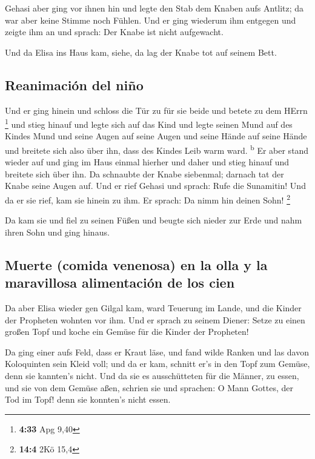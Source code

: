  Gehasi aber ging vor ihnen hin und legte den Stab dem
Knaben aufs Antlitz; da war aber keine Stimme noch Fühlen. Und er ging
wiederum ihm entgegen und zeigte ihm an und sprach: Der Knabe ist nicht
aufgewacht.

 Und da Elisa ins Haus kam, siehe, da lag der Knabe tot
auf seinem Bett.

\hypertarget{reanimaciuxf3n-del-niuxf1o}{%
\subsection{Reanimación del niño}\label{reanimaciuxf3n-del-niuxf1o}}

 Und er ging hinein und schloss die Tür zu für sie beide
und betete zu dem HErrn \footnote{\textbf{4:33} Apg 9,40}
 und stieg hinauf und legte sich auf das Kind und legte
seinen Mund auf des Kindes Mund und seine Augen auf seine Augen und
seine Hände auf seine Hände und breitete sich also über ihn, dass des
Kindes Leib warm ward. \textsuperscript{b}  Er aber stand
wieder auf und ging im Haus einmal hierher und daher und stieg hinauf
und breitete sich über ihn. Da schnaubte der Knabe siebenmal; darnach
tat der Knabe seine Augen auf.  Und er rief Gehasi und
sprach: Rufe die Sunamitin! Und da er sie rief, kam sie hinein zu ihm.
Er sprach: Da nimm hin deinen Sohn! \footnote{\textbf{14:4} 2Kö 15,4}

 Da kam sie und fiel zu seinen Füßen und beugte sich
nieder zur Erde und nahm ihren Sohn und ging hinaus.

\hypertarget{muerte-comida-venenosa-en-la-olla-y-la-maravillosa-alimentaciuxf3n-de-los-cien}{%
\subsection{Muerte (comida venenosa) en la olla y la maravillosa
alimentación de los
cien}\label{muerte-comida-venenosa-en-la-olla-y-la-maravillosa-alimentaciuxf3n-de-los-cien}}

 Da aber Elisa wieder gen Gilgal kam, ward Teuerung im
Lande, und die Kinder der Propheten wohnten vor ihm. Und er sprach zu
seinem Diener: Setze zu einen großen Topf und koche ein Gemüse für die
Kinder der Propheten!

 Da ging einer aufs Feld, dass er Kraut läse, und fand
wilde Ranken und las davon Koloquinten sein Kleid voll; und da er kam,
schnitt er's in den Topf zum Gemüse, denn sie kannten's nicht.
 Und da sie es ausschütteten für die Männer, zu essen,
und sie von dem Gemüse aßen, schrien sie und sprachen: O Mann Gottes,
der Tod im Topf! denn sie konnten's nicht essen.

